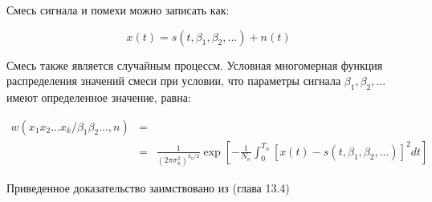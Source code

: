 Смесь сигнала и помехи можно записать как:
\begin{center}
\begin{equation}
	\label{eq:signal_and_noise}
	x(t) = s(t, \beta_1, \beta_2, ...) + n(t)
\end{equation}
\end{center}
Смесь также является случайным процессм. Условная многомерная функция распределения значений смеси при условии, что параметры
сигнала ${\beta_1, \beta_2, ...}$ имеют определенное значение, равна:
\begin{center}
\begin{eqnarray}
	\label{eq:signal_and_noise2}
	w(x_{1}x_{2}...x_{k}/\beta_1 \beta_2 ..., n) & = & \\
	& = & \frac{1}{(2\pi\sigma_{n}^{2})^{k_n/2}}\exp[-\frac{1}{N_n}\int_{0}^{T_n}[x(t) - s(t, \beta_1, \beta_2, ...)]^2 dt] \nonumber
\end{eqnarray}
\end{center}

Приведенное доказательство заимствовано из \cite{pugachev} (глава 13.4)

\newpage
